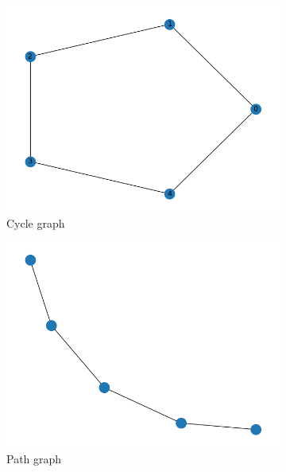 \documentclass[a4paper,11pt,oneside]{book}
\begin{document}
\begin{figure}[H]
\centering
    \begin{subfigure}{0.32\textwidth}
    \includegraphics[width=\textwidth]{cycle/graph}
    \caption{Cycle graph}
    \end{subfigure}
\hfill
    \begin{subfigure}{0.32\textwidth}
    \includegraphics[width=\textwidth]{path/graph}
    \caption{Path graph}
    \end{subfigure}
\hfill
    \begin{subfigure}{0.32\textwidth}

\end{subfigure}
\end{figure}
\end{document}
